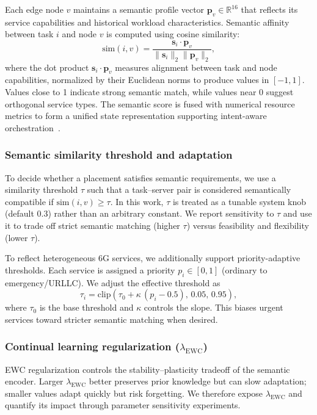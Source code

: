 \documentclass[conference]{IEEEtran}
\begin{document}
		Each edge node $v$ maintains a semantic profile vector $\mathbf{p}_v \in \mathbb{R}^{16}$ that reflects its service capabilities and historical workload characteristics. Semantic affinity between task $i$ and node $v$ is computed using cosine similarity:
		\begin{equation}
			\text{sim}(i,v) = \frac{\mathbf{s}_i \cdot \mathbf{p}_v}{\|\mathbf{s}_i\|_2 \|\mathbf{p}_v\|_2},
		\end{equation}
		where the dot product $\mathbf{s}_i \cdot \mathbf{p}_v$ measures alignment between task and node capabilities, normalized by their Euclidean norms to produce values in $[-1, 1]$. Values close to 1 indicate strong semantic match, while values near 0 suggest orthogonal service types. The semantic score is fused with numerical resource metrics to form a unified state representation supporting intent-aware orchestration~\cite{grasso2022hhome}.
		
		\subsubsection{Semantic similarity threshold and adaptation}
		To decide whether a placement satisfies semantic requirements, we use a similarity threshold $\tau$ such that a task--server pair is considered semantically compatible if $\mathrm{sim}(i,v)\ge\tau$. In this work, $\tau$ is treated as a tunable system knob (default $0.3$) rather than an arbitrary constant. We report sensitivity to $\tau$ and use it to trade off strict semantic matching (higher $\tau$) versus feasibility and flexibility (lower $\tau$).
		
		To reflect heterogeneous 6G services, we additionally support priority-adaptive thresholds. Each service is assigned a priority $p_i\in[0,1]$ (ordinary to emergency/URLLC). We adjust the effective threshold as
		\begin{equation}
			\tau_i = \mathrm{clip}(\tau_0 + \kappa\,(p_i-0.5),\,0.05,\,0.95),
		\end{equation}
		where $\tau_0$ is the base threshold and $\kappa$ controls the slope. This biases urgent services toward stricter semantic matching when desired.
		
		\subsubsection{Continual learning regularization ($\lambda_{\mathrm{EWC}}$)}
		EWC regularization controls the stability--plasticity tradeoff of the semantic encoder. Larger $\lambda_{\mathrm{EWC}}$ better preserves prior knowledge but can slow adaptation; smaller values adapt quickly but risk forgetting. We therefore expose $\lambda_{\mathrm{EWC}}$ and quantify its impact through parameter sensitivity experiments.
		
\end{document}
